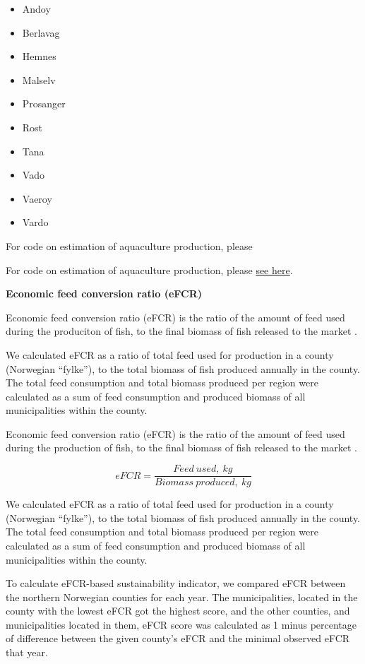 \documentclass[
]{book}
\providecommand{\tightlist}{%
  \setlength{\itemsep}{0pt}\setlength{\parskip}{0pt}}
\begin{document}
\begin{itemize}
\tightlist
\item
  Andoy
\item
  Berlavag
\item
  Hemnes
\item
  Malselv
\item
  Prosanger
\item
  Rost
\item
  Tana
\item
  Vado
\item
  Vaeroy
\item
  Vardo
\end{itemize}

For code on estimation of aquaculture production, please

For code on estimation of aquaculture production, please
\href{https://ohi-norway.github.io/nor-prep/prep/food_provision/Mariculture/total_aquaculture_production_and_efcr_newdata_jan2020.html}{see here}.

\textbf{Economic feed conversion ratio (eFCR)}

Economic feed conversion ratio (eFCR) is the ratio of the amount of feed used during the produciton of fish, to the final biomass of fish released to the market \citep{boyd2007indicators}.

We calculated eFCR as a ratio of total feed used for production in a county (Norwegian ``fylke''), to the total biomass of fish produced annually in the county. The total feed consumption and total biomass produced per region were calculated as a sum of feed consumption and produced biomass of all municipalities within the county.

Economic feed conversion ratio (eFCR) is the ratio of the amount of feed used during the production of fish, to the final biomass of fish released to the market \citep{boyd2007indicators}.

\begin{equation}
eFCR = \frac{Feed \ used,\ kg}{Biomass\ produced,\ kg}
 \label{eq:efcr}
\end{equation}

We calculated eFCR as a ratio of total feed used for production in a county (Norwegian ``fylke''), to the total biomass of fish produced annually in the county. The total feed consumption and total biomass produced per region were calculated as a sum of feed consumption and produced biomass of all municipalities within the county.

To calculate eFCR-based sustainability indicator, we compared eFCR between the northern Norwegian counties for each year. The municipalities, located in the county with the lowest eFCR got the highest score, and the other counties, and municipalities located in them, eFCR score was calculated as 1 minus percentage of difference between the given county's eFCR and the minimal observed eFCR that year.
\end{document}
